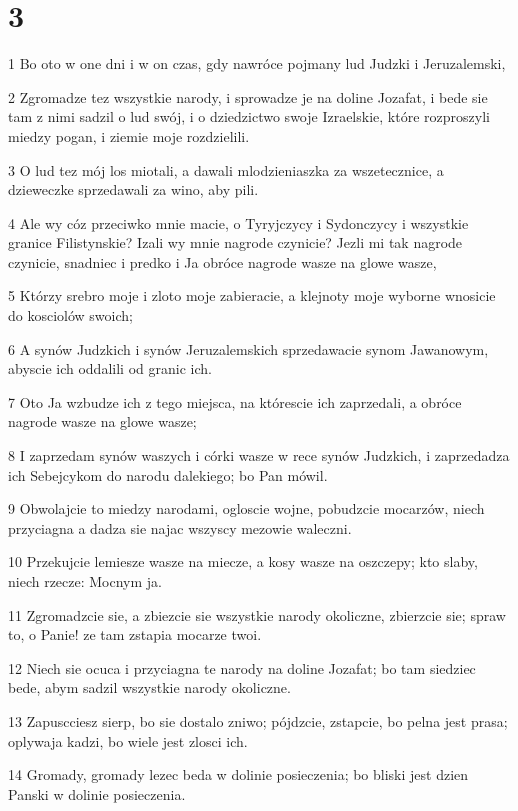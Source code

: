 \chapter{3}

\par 1 Bo oto w one dni i w on czas, gdy nawróce pojmany lud Judzki i Jeruzalemski,
\par 2 Zgromadze tez wszystkie narody, i sprowadze je na doline Jozafat, i bede sie tam z nimi sadzil o lud swój, i o dziedzictwo swoje Izraelskie, które rozproszyli miedzy pogan, i ziemie moje rozdzielili.
\par 3 O lud tez mój los miotali, a dawali mlodzieniaszka za wszetecznice, a dzieweczke sprzedawali za wino, aby pili.
\par 4 Ale wy cóz przeciwko mnie macie, o Tyryjczycy i Sydonczycy i wszystkie granice Filistynskie? Izali wy mnie nagrode czynicie? Jezli mi tak nagrode czynicie, snadniec i predko i Ja obróce nagrode wasze na glowe wasze,
\par 5 Którzy srebro moje i zloto moje zabieracie, a klejnoty moje wyborne wnosicie do kosciolów swoich;
\par 6 A synów Judzkich i synów Jeruzalemskich sprzedawacie synom Jawanowym, abyscie ich oddalili od granic ich.
\par 7 Oto Ja wzbudze ich z tego miejsca, na którescie ich zaprzedali, a obróce nagrode wasze na glowe wasze;
\par 8 I zaprzedam synów waszych i córki wasze w rece synów Judzkich, i zaprzedadza ich Sebejcykom do narodu dalekiego; bo Pan mówil.
\par 9 Obwolajcie to miedzy narodami, ogloscie wojne, pobudzcie mocarzów, niech przyciagna a dadza sie najac wszyscy mezowie waleczni.
\par 10 Przekujcie lemiesze wasze na miecze, a kosy wasze na oszczepy; kto slaby, niech rzecze: Mocnym ja.
\par 11 Zgromadzcie sie, a zbiezcie sie wszystkie narody okoliczne, zbierzcie sie; spraw to, o Panie! ze tam zstapia mocarze twoi.
\par 12 Niech sie ocuca i przyciagna te narody na doline Jozafat; bo tam siedziec bede, abym sadzil wszystkie narody okoliczne.
\par 13 Zapuscciesz sierp, bo sie dostalo zniwo; pójdzcie, zstapcie, bo pelna jest prasa; oplywaja kadzi, bo wiele jest zlosci ich.
\par 14 Gromady, gromady lezec beda w dolinie posieczenia; bo bliski jest dzien Panski w dolinie posieczenia.
